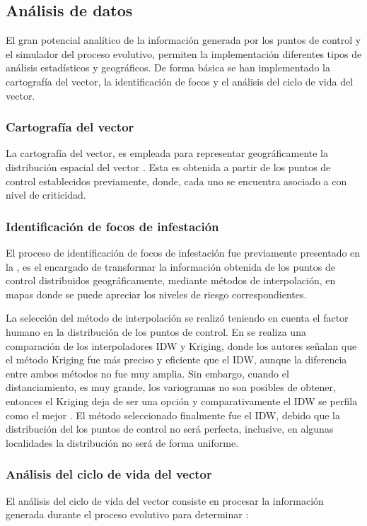 \subsection{Análisis de datos}
El gran potencial analítico de la información generada por los puntos de control y el simulador
del proceso evolutivo, permiten la implementación diferentes tipos de análisis estadísticos y
geográficos. De forma básica se han implementado la cartografía del vector, la identificación de
focos y el análisis del ciclo de vida del vector.

\subsubsection{Cartografía del vector}
La cartografía del vector, es empleada para representar geográficamente la distribución espacial
del vector \citep{vgomesAegis2001}. Esta es obtenida a partir de los puntos de control establecidos
previamente, donde, cada uno se encuentra asociado a con nivel de criticidad.

\subsubsection{Identificación de focos de infestación}
\label{sec:cap5-identificacion-focos}
El proceso de identificación de focos de infestación fue previamente presentado en la
, es el encargado de transformar la información obtenida de
los puntos de control distribuidos geográficamente, mediante métodos de interpolación, en mapas
donde se puede apreciar los niveles de riesgo correspondientes.

La selección del método de interpolación se realizó teniendo en cuenta el factor humano en la
distribución de los puntos de control. En \cite{villatoro2007comparacion} se realiza una
comparación de los interpoladores IDW y Kriging, donde los autores señalan que el método Kriging
fue más preciso y eficiente que el IDW, aunque la diferencia entre ambos métodos no fue muy amplia.
Sin embargo, cuando el distanciamiento, es muy grande, los variogramas no son posibles de obtener,
entonces el Kriging deja de ser una opción y comparativamente el IDW se perfila como el mejor
\cite{villatoro2007comparacion}. El método seleccionado finalmente fue el IDW, debido que la
distribución del los puntos de control no será perfecta, inclusive, en algunas localidades la
distribución no será de forma uniforme.

\subsubsection{Análisis del ciclo de vida del vector}
El análisis del ciclo de vida del vector consiste en procesar la información generada durante el
proceso evolutivo para determinar :

